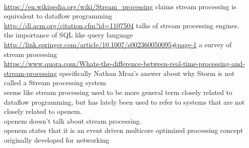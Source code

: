  \\
\url{https://en.wikipedia.org/wiki/Stream_processing} claims stream processing is equivalent to dataflow programming \\
\url{http://dl.acm.org/citation.cfm?id=1107504} talks of stream processing engines. the importance of SQL like query language \\
\url{http://link.springer.com/article/10.1007/s002360050095#page-1} a survey of stream processing \\
\url{https://www.quora.com/Whats-the-difference-between-real-time-processing-and-stream-processing} specifically Nathan Mraz's answer about why Storm is not called a Stream processing system \\
seems like stream processing used to be more general term closely related to dataflow programming, but has lately been used to refer to systems that are not closely related to openem. \\
openem doesn't talk about stream processing. \\
openem states that it is an event driven multicore optimized processing concept originally developed for networking \\
